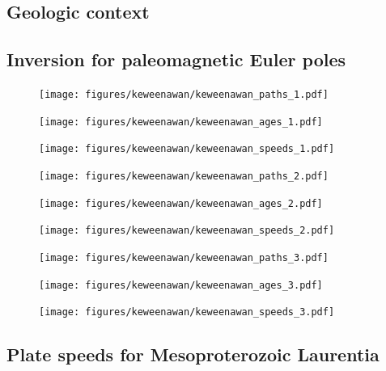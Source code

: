 \documentclass[preprint,12pt,authoryear]{elsarticle}
\begin{document}
\subsection{Geologic context}
\citet{swanson2009no}
\subsection{Inversion for paleomagnetic Euler poles}
\clearpage
\begin{figure}
\texttt{[image: figures/keweenawan/keweenawan\_paths\_1.pdf]}
\caption{}
\label{fig:keweenawan_paths_1}
\end{figure}
\begin{figure}
\texttt{[image: figures/keweenawan/keweenawan\_ages\_1.pdf]}
\caption{}
\label{fig:keweenawan_ages_1}
\end{figure}
\begin{figure}
\texttt{[image: figures/keweenawan/keweenawan\_speeds\_1.pdf]}
\caption{}
\label{fig:keweenawan_speeds_1}
\end{figure}
\begin{figure}
\texttt{[image: figures/keweenawan/keweenawan\_paths\_2.pdf]}
\caption{}
\label{fig:keweenawan_paths_2}
\end{figure}
\begin{figure}
\texttt{[image: figures/keweenawan/keweenawan\_ages\_2.pdf]}
\caption{}
\label{fig:keweenawan_ages_2}
\end{figure}
\begin{figure}
\texttt{[image: figures/keweenawan/keweenawan\_speeds\_2.pdf]}
\caption{}
\label{fig:keweenawan_speeds_2}
\end{figure}
\begin{figure}
\texttt{[image: figures/keweenawan/keweenawan\_paths\_3.pdf]}
\caption{}
\label{fig:keweenawan_paths_3}
\end{figure}
\begin{figure}
\texttt{[image: figures/keweenawan/keweenawan\_ages\_3.pdf]}
\caption{}
\label{fig:keweenawan_ages_3}
\end{figure}
\begin{figure}
\texttt{[image: figures/keweenawan/keweenawan\_speeds\_3.pdf]}
\caption{}
\label{fig:keweenawan_speeds_3}
\end{figure}
\subsection{Plate speeds for Mesoproterozoic Laurentia}
\end{document}
